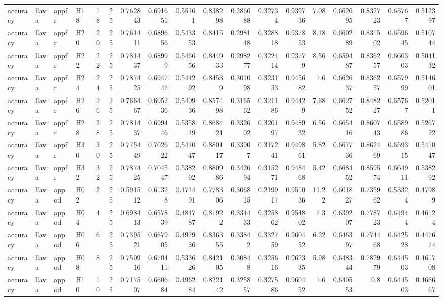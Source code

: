\begin{longtable}{llllrrrrrrrrrrrrrr}
accuracy & llava & appfr & H18 & 18 & 25 & 0.762843 & 0.691651 & 0.55161 & 0.838298 & 0.286688 & 0.32734 & 0.939736 & 7.08 & 0.662695 & 0.832723 & 0.65767 & 0.512397 \\
accuracy & llava & appfr & H20 & 20 & 25 & 0.761411 & 0.689656 & 0.543353 & 0.8415 & 0.298148 & 0.328818 & 0.937853 & 8.18 & 0.660289 & 0.831502 & 0.659645 & 0.510744 \\
accuracy & llava & appfr & H22 & 22 & 25 & 0.781437 & 0.68999 & 0.546656 & 0.844933 & 0.298277 & 0.322414 & 0.93779 & 8.56 & 0.659487 & 0.836257 & 0.660303 & 0.504132 \\
accuracy & llava & appfr & H24 & 24 & 25 & 0.787425 & 0.694747 & 0.544292 & 0.84539 & 0.301098 & 0.323153 & 0.945682 & 7.6 & 0.662637 & 0.836257 & 0.657999 & 0.514601 \\
accuracy & llava & appfr & H26 & 26 & 25 & 0.766467 & 0.695236 & 0.540936 & 0.857498 & 0.316562 & 0.321186 & 0.94429 & 7.68 & 0.662752 & 0.848227 & 0.65767 & 0.52011 \\
accuracy & llava & appfr & H28 & 28 & 25 & 0.781437 & 0.699446 & 0.535819 & 0.868421 & 0.332602 & 0.320197 & 0.948932 & 6.56 & 0.665416 & 0.860743 & 0.658986 & 0.526722 \\
accuracy & llava & appfr & H30 & 30 & 25 & 0.775449 & 0.702622 & 0.541047 & 0.880117 & 0.33907 & 0.317241 & 0.949861 & 5.82 & 0.667736 & 0.862469 & 0.659315 & 0.541047 \\
accuracy & llava & appfr & H32 & 32 & 25 & 0.787425 & 0.704547 & 0.538292 & 0.880986 & 0.342694 & 0.315271 & 0.948468 & 5.42 & 0.668452 & 0.859574 & 0.664911 & 0.538292 \\
accuracy & llava & appod & H02 & 2 & 25 & 0.591512 & 0.61328 & 0.471491 & 0.778306 & 0.306815 & 0.219917 & 0.951036 & 11.22 & 0.601827 & 0.735962 & 0.53324 & 0.47989 \\
accuracy & llava & appod & H04 & 4 & 25 & 0.698413 & 0.657839 & 0.484787 & 0.81922 & 0.334433 & 0.325862 & 0.954802 & 7.3 & 0.639207 & 0.778723 & 0.64944 & 0.46124 \\
accuracy & llava & appod & H06 & 6 & 25 & 0.739521 & 0.667905 & 0.497936 & 0.836355 & 0.33842 & 0.332759 & 0.960452 & 6.22 & 0.646397 & 0.774468 & 0.642528 & 0.447674 \\
accuracy & llava & appod & H08 & 8 & 25 & 0.750916 & 0.670411 & 0.533626 & 0.842105 & 0.30848 & 0.325616 & 0.962335 & 5.98 & 0.648344 & 0.782979 & 0.644503 & 0.461708 \\
accuracy & llava & appod & H10 & 10 & 25 & 0.717507 & 0.660684 & 0.496284 & 0.822142 & 0.325857 & 0.327586 & 0.960452 & 7.6 & 0.640553 & 0.8 & 0.644503 & 0.466667 \\

\end{longtable}
